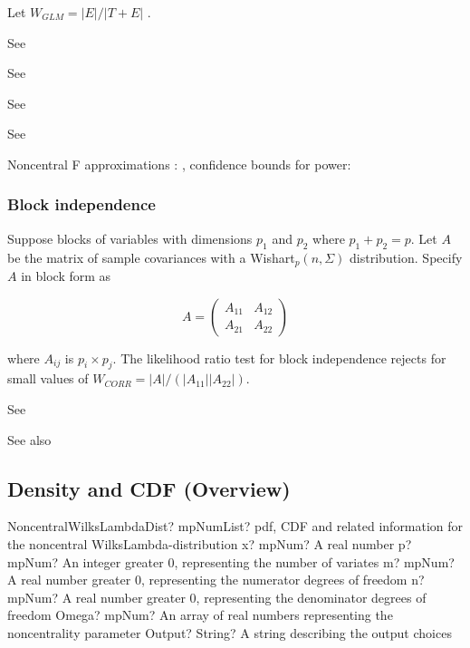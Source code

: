 Let $W_{GLM} = | E | / | T + E |$ .

See \cite{OBrien1992}

See \cite{lee_results_1972}

See \cite{lee_asymptotic_1971}

See \cite{Kulp_1984}

Noncentral F approximations : \cite{Muller_1992} , confidence bounds for power: \cite{Taylor_1995}

\subsubsection{Block independence}
\label{WilksLambdaDistributionDefinition_CORR}
Suppose blocks of variables with dimensions $p_1$ and $p_2$ where $p_1 + p_2 = p$.
Let $A$ be the matrix of sample covariances with a Wishart${}_p (n,\Sigma)$ distribution.
Specify $A$ in block form as

\begin{equation}
	A = \begin{pmatrix}
		A_{11} & A_{12}  \\
		A_{21} & A_{22} 
	\end{pmatrix}
\end{equation}

where $A_{ij}$ is $p_i \times p_j$. The likelihood ratio test for block independence rejects for small values of $W_{CORR} = |A|/(|A_{11}||A_{22}|)$.


See \cite{lee_distribution_1971}

See also \cite{Butler2005}




\subsection{Density and CDF (Overview)}

\begin{mpFunctionsExtract}
	\mpFunctionSixNotImplemented
	{NoncentralWilksLambdaDist? mpNumList? pdf, CDF and related information for the noncentral WilksLambda-distribution}
	{x? mpNum? A real number}
	{p? mpNum? An integer greater 0, representing the number of variates}
	{m? mpNum? A real number greater 0, representing the numerator  degrees of freedom}
	{n? mpNum? A real number greater 0, representing the denominator degrees of freedom}
	{Omega? mpNum? An array of real numbers representing the noncentrality parameter}
	{Output? String? A string describing the output choices}
\end{mpFunctionsExtract}


